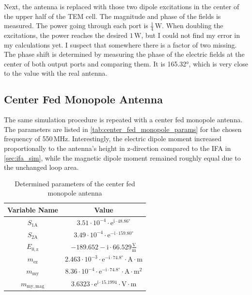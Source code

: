 Next, the antenna is replaced with those two dipole excitations in the center of the upper half of the TEM cell. The magnitude and phase of the fields is measured. The power going through each port is $\frac{1}{4}\,\mathrm{W}$. When doubling the excitations, the power reaches the desired $1\,\mathrm{W}$, but I could not find my error in my calculations yet. I suspect that somewhere there is a factor of two missing. The phase shift is determined by measuring the phase of the electric fields at the center of both output ports and comparing them. It is 165.32°, which is very close to the value with the real antenna.

\subsection{Center Fed Monopole Antenna}

The same simulation procedure is repeated with a center fed monopole antenna. The parameters are listed in \autoref{tab:center_fed_monopole_params} for the chosen frequency of 550\,MHz. Interestingly, the electric dipole moment increased proportionally to the antenna's height in z-direction compared to the IFA in \autoref{sec:ifa_sim}, while the magnetic dipole moment remained roughly equal due to the unchanged loop area.


\begin{table}[h]
    \centering
    \begin{tabular}{|c|c|}
        \hline
        Variable Name & Value\\\hline\hline
        $S_{1\mathrm{A}}$ & $3.51\cdot10^{-4}\cdot \mathrm{e}^{\mathrm{i}\cdot 48.86°}$\\\hline
         $S_{2\mathrm{A}}$&$3.49\cdot10^{-4}\cdot\mathrm{e}^{-\mathrm{i}\cdot 159.80°}$ \\\hline
         $E_{0,\mathrm{z}}$&$-189.652 -\mathrm{i}\cdot66.529\mathrm{\frac{V}{m}}$ \\\hline
         $m_{\mathrm{ez}}$&$2.463\cdot10^{-3}\cdot\mathrm{e}^{-\mathrm{i}\cdot74.8°}\cdot\mathrm{A\cdot m}$ \\\hline
         $m_{\mathrm{my}}$&$8.36\cdot10^{-4}\cdot\mathrm{e}^{-\mathrm{i}\cdot 74.8°}\cdot\mathrm{A\cdot m^2}$ \\\hline
         $m_{\mathrm{my,mag}}$&$3.6323\cdot\mathrm{e}^{\mathrm{i}\cdot15.1994}\cdot\mathrm{V\cdot m}$ \\\hline
    \end{tabular}
    \caption{Determined parameters of the center fed monopole antenna}
    \label{tab:center_fed_monopole_params}
\end{table}

